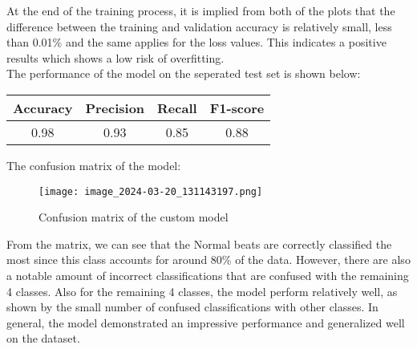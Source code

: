 \documentclass{report}
\begin{document}
At the end of the training process, it is implied from both of the plots that the difference between the training and validation accuracy is relatively small, less than 0.01\% and the same applies for the loss values. This indicates a positive results which shows a low risk of overfitting.\\


The performance of the model on the seperated test set is shown below:

\begin{center}
\begin{tabular}{|c | c | c | c|} 
 \hline
 Accuracy & Precision & Recall & F1-score \\ [0.5ex] 
 \hline\hline
 0.98 & 0.93 & 0.85 & 0.88 \\ 
 \hline
\end{tabular}
\end{center}

The confusion matrix of the model:\\

\begin{figure}[!h]
    \centering
    \texttt{[image: image\_2024-03-20\_131143197.png]}
    \caption{Confusion matrix of the custom model}
\end{figure}

From the matrix, we can see that the Normal beats are correctly classified the most since this class accounts for around 80\% of the data. However, there are also a notable amount of incorrect classifications that are confused with the remaining 4 classes. Also for the remaining 4 classes, the model perform relatively well, as shown by the small number of confused classifications with other classes. In general, the model demonstrated an impressive performance and generalized well on the dataset.
\end{document}
